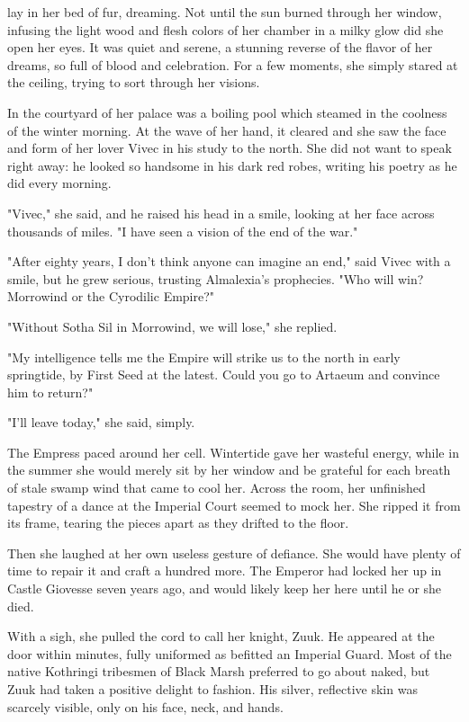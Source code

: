  lay in her bed of fur, dreaming. Not until the sun burned through her window, infusing the light wood and flesh colors of her chamber in a milky glow did she open her eyes. It was quiet and serene, a stunning reverse of the flavor of her dreams, so full of blood and celebration. For a few moments, she simply stared at the ceiling, trying to sort through her visions.

In the courtyard of her palace was a boiling pool which steamed in the coolness of the winter morning. At the wave of her hand, it cleared and she saw the face and form of her lover Vivec in his study to the north. She did not want to speak right away: he looked so handsome in his dark red robes, writing his poetry as he did every morning.

"Vivec," she said, and he raised his head in a smile, looking at her face across thousands of miles. "I have seen a vision of the end of the war."

"After eighty years, I don't think anyone can imagine an end," said Vivec with a smile, but he grew serious, trusting Almalexia's prophecies. "Who will win? Morrowind or the Cyrodilic Empire?"

"Without Sotha Sil in Morrowind, we will lose," she replied.

"My intelligence tells me the Empire will strike us to the north in early springtide, by First Seed at the latest. Could you go to Artaeum and convince him to return?"

"I'll leave today," she said, simply.

The Empress paced around her cell. Wintertide gave her wasteful energy, while in the summer she would merely sit by her window and be grateful for each breath of stale swamp wind that came to cool her. Across the room, her unfinished tapestry of a dance at the Imperial Court seemed to mock her. She ripped it from its frame, tearing the pieces apart as they drifted to the floor.

Then she laughed at her own useless gesture of defiance. She would have plenty of time to repair it and craft a hundred more. The Emperor had locked her up in Castle Giovesse seven years ago, and would likely keep her here until he or she died.

With a sigh, she pulled the cord to call her knight, Zuuk. He appeared at the door within minutes, fully uniformed as befitted an Imperial Guard. Most of the native Kothringi tribesmen of Black Marsh preferred to go about naked, but Zuuk had taken a positive delight to fashion. His silver, reflective skin was scarcely visible, only on his face, neck, and hands.

